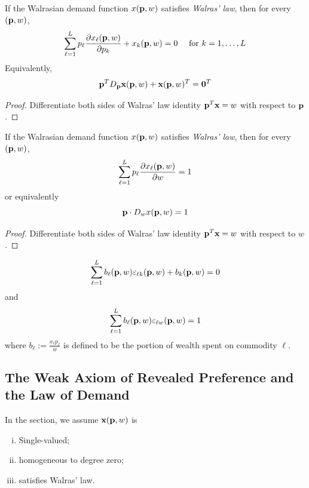 \documentclass{article}
\begin{document}
 			\begin{proposition}
 				If the Walrasian demand function $x(\textbf{p}, w)$ satisfies \emph{Walras' law}, then for every $(\textbf{p}, w)$,
 				\begin{equation}
 					\sum_{\ell=1}^{L} p_{\ell} \frac{\partial x_{\ell}(\textbf{p}, w)}{\partial p_{k}}+x_{k}(\textbf{p}, w)= 0 \quad \text { for } k=1, \ldots, L
 				\end{equation}
 				Equivalently,
 				\begin{equation}
 					\textbf{p}^T D_{\textbf{p}} \textbf{x} (\textbf{p}, w) + \textbf{x}(\textbf{p}, w)^T = \textbf{0}^T
 				\end{equation}
 				\begin{proof}
 					Differentiate both sides of Walras' law identity $\textbf{p}^T \textbf{x} = w$ with respect to $\textbf{p}$.
 				\end{proof}
 			\end{proposition}
 			
 			\begin{proposition}
 				If the Walrasian demand function $x(\textbf{p}, w)$ satisfies \emph{Walras' law}, then for every $(\textbf{p}, w)$,
 				\begin{equation}
 					\sum_{\ell=1}^{L} p_{\ell} \frac{\partial x_{\ell}(\textbf{p}, w)}{\partial w}=1
 				\end{equation}
 				or equivalently
 				\begin{equation}
 					\textbf{p} \cdot D_{w} x(\textbf{p}, w) = 1
 				\end{equation}
 				\begin{proof}
 					Differentiate both sides of Walras' law identity $\textbf{p}^T \textbf{x} = w$ with respect to $w$.
 				\end{proof}
 			\end{proposition}
 		
 			\begin{proposition}[Exer. 2.E.2]
 				\begin{gather}
 					\sum_{\ell=1}^{L} b_{\ell}(\textbf{p}, w) \varepsilon_{\ell k}(\textbf{p}, w)+b_{k}(\textbf{p}, w)=0
 				\end{gather}
 				and
 				\begin{gather}
 					\sum_{\ell=1}^{L} b_{\ell}(\textbf{p}, w) \varepsilon_{\ell w}(\textbf{p}, w)=1
 				\end{gather}
 				where $b_\ell := \frac{x_\ell p_\ell}{w}$ is defined to be the portion of wealth spent on commodity $\ell$.
 			\end{proposition}
 			
 		\subsection{The Weak Axiom of Revealed Preference and the Law of Demand}
 			\begin{assumption}
 				In the section, we assume $\textbf{x}(\textbf{p}, w)$ is 
 				\begin{enumerate}[(i)]
 					\item Single-valued;
 					\item homogeneous to degree zero;
 					\item satisfies Walras' law.
 				\end{enumerate}
 			\end{assumption}
 			
\end{document}
